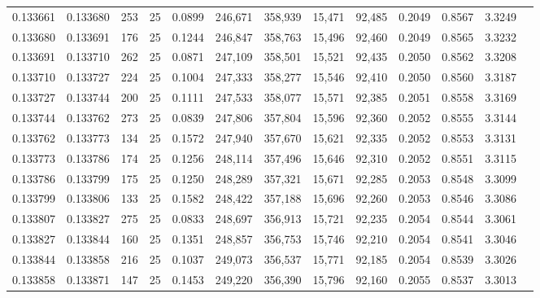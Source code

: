 \begin{tabular}{rrrrrrrrrrrrr}
0.133661 & 0.133680 &   253 &  25 &                                     0.0899 & 246,671 & 358,939 &  15,471 &  92,485 & 0.2049 & 0.8567 & 3.3249 \\
0.133680 & 0.133691 &   176 &  25 &                                     0.1244 & 246,847 & 358,763 &  15,496 &  92,460 & 0.2049 & 0.8565 & 3.3232 \\
0.133691 & 0.133710 &   262 &  25 &                                     0.0871 & 247,109 & 358,501 &  15,521 &  92,435 & 0.2050 & 0.8562 & 3.3208 \\
0.133710 & 0.133727 &   224 &  25 &                                     0.1004 & 247,333 & 358,277 &  15,546 &  92,410 & 0.2050 & 0.8560 & 3.3187 \\
0.133727 & 0.133744 &   200 &  25 &                                     0.1111 & 247,533 & 358,077 &  15,571 &  92,385 & 0.2051 & 0.8558 & 3.3169 \\
0.133744 & 0.133762 &   273 &  25 &                                     0.0839 & 247,806 & 357,804 &  15,596 &  92,360 & 0.2052 & 0.8555 & 3.3144 \\
0.133762 & 0.133773 &   134 &  25 &                                     0.1572 & 247,940 & 357,670 &  15,621 &  92,335 & 0.2052 & 0.8553 & 3.3131 \\
0.133773 & 0.133786 &   174 &  25 &                                     0.1256 & 248,114 & 357,496 &  15,646 &  92,310 & 0.2052 & 0.8551 & 3.3115 \\
0.133786 & 0.133799 &   175 &  25 &                                     0.1250 & 248,289 & 357,321 &  15,671 &  92,285 & 0.2053 & 0.8548 & 3.3099 \\
0.133799 & 0.133806 &   133 &  25 &                                     0.1582 & 248,422 & 357,188 &  15,696 &  92,260 & 0.2053 & 0.8546 & 3.3086 \\
0.133807 & 0.133827 &   275 &  25 &                                     0.0833 & 248,697 & 356,913 &  15,721 &  92,235 & 0.2054 & 0.8544 & 3.3061 \\
0.133827 & 0.133844 &   160 &  25 &                                     0.1351 & 248,857 & 356,753 &  15,746 &  92,210 & 0.2054 & 0.8541 & 3.3046 \\
0.133844 & 0.133858 &   216 &  25 &                                     0.1037 & 249,073 & 356,537 &  15,771 &  92,185 & 0.2054 & 0.8539 & 3.3026 \\
0.133858 & 0.133871 &   147 &  25 &                                     0.1453 & 249,220 & 356,390 &  15,796 &  92,160 & 0.2055 & 0.8537 & 3.3013 \\

\end{tabular}
